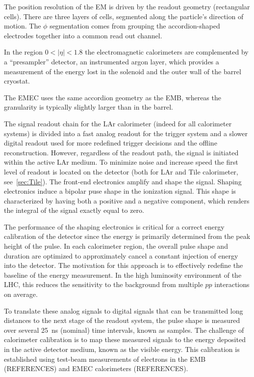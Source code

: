 The position resolution of the EM is driven by the readout geometry (rectangular cells). There are three layers of cells, segmented along the particle's direction of motion.  The $\phi$ segmentation comes from grouping the accordion-shaped electrodes together into a common read out channel. 

In the region $0 <|\eta| < 1.8$ the electromagnetic calorimeters are complemented by a ``presampler'' detector, an instrumented argon layer, which provides a measurement of the energy lost in the solenoid and the outer wall of the barrel cryostat.

The EMEC uses the same accordion geometry as the EMB, whereas the granularity is typically slightly larger than in the barrel.

The signal readout chain for the LAr calorimeter (indeed for all calorimeter systems) is divided into a fast analog readout for the trigger system and a slower digital readout used for more redefined trigger decisions and the offline reconstruction. However, regardless of the readout path, the signal is initiated within the active LAr medium. To minimize noise and increase speed the first level of readout is located on the detector (both for LAr and Tile calorimeter, see~\ref{sec:Tile}). The front-end electronics amplify and shape the signal. Shaping electronics induce a bipolar puse shape in the ionization signal. This shape is characterized by having both a positive and a negative component, which renders the integral of the signal exactly equal to zero.

The performance of the shaping electronics is critical for a correct energy calibration of the detector since the energy is primarily determined from the peak height of the pulse. %
In each calorimeter region, the overall pulse shape and duration are optimized to approximately cancel a constant injection of energy into the detector. The motivation for this approach is to effectively redefine the baseline of the energy measurement. In the high luminosity environment of the LHC, this reduces the sensitivity to the background from multiple $pp$ interactions on average.

To translate these analog signals to digital signals that can be transmitted long distances to the next stage of the readout system, the pulse shape is measured over several 25~ns (nominal) time intervals, known as samples. The challenge of calorimeter calibration is to map these measured signals to the energy deposited in the active detector medium, known as the visible energy. This calibration is established using test-beam measurements of electrons in the EMB (REFERENCES) and EMEC calorimeters (REFERENCES). 


